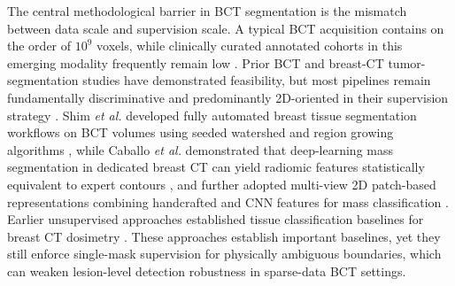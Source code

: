\documentclass{iopjournal}
\begin{document}
The central methodological barrier in BCT segmentation is the mismatch between data scale and supervision scale. A typical BCT acquisition contains on the order of $10^9$ voxels, while clinically curated annotated cohorts in this emerging modality frequently remain low \cite{shim2022fully, caballo2020mass}. Prior BCT and breast-CT tumor-segmentation studies have demonstrated feasibility, but most pipelines remain fundamentally discriminative and predominantly 2D-oriented in their supervision strategy \cite{caballo2020mass, shim2022fully, lyu2021computer, caballo2018unsupervised}. Shim \emph{et al.} developed fully automated breast tissue segmentation workflows on BCT volumes using seeded watershed and region growing algorithms \cite{shim2022fully}, while Caballo \emph{et al.} demonstrated that deep-learning mass segmentation in dedicated breast CT can yield radiomic features statistically equivalent to expert contours \cite{caballo2020mass}, and further adopted multi-view 2D patch-based representations combining handcrafted and CNN features for mass classification \cite{lyu2021computer}. Earlier unsupervised approaches established tissue classification baselines for breast CT dosimetry \cite{caballo2018unsupervised}. These approaches establish important baselines, yet they still enforce single-mask supervision for physically ambiguous boundaries, which can weaken lesion-level detection robustness in sparse-data BCT settings.
\end{document}
